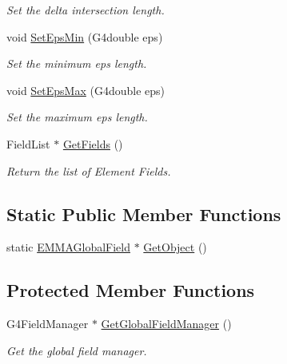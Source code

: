 \begin{DoxyCompactItemize}
\begin{DoxyCompactList}\small\item\em Set the delta intersection length. \end{DoxyCompactList}\item 
\hypertarget{classEMMAGlobalField_a9fe3615c5d73f4822e7d1a943bc8438c}{void \hyperlink{classEMMAGlobalField_a9fe3615c5d73f4822e7d1a943bc8438c}{Set\-Eps\-Min} (G4double eps)}\label{classEMMAGlobalField_a9fe3615c5d73f4822e7d1a943bc8438c}

\begin{DoxyCompactList}\small\item\em Set the minimum eps length. \end{DoxyCompactList}\item 
\hypertarget{classEMMAGlobalField_ad31573ebe91b18d3de81365ff5c02b0b}{void \hyperlink{classEMMAGlobalField_ad31573ebe91b18d3de81365ff5c02b0b}{Set\-Eps\-Max} (G4double eps)}\label{classEMMAGlobalField_ad31573ebe91b18d3de81365ff5c02b0b}

\begin{DoxyCompactList}\small\item\em Set the maximum eps length. \end{DoxyCompactList}\item 
\hypertarget{classEMMAGlobalField_a44035b4b2d642ec3faa2719bc6ed6b06}{Field\-List $\ast$ \hyperlink{classEMMAGlobalField_a44035b4b2d642ec3faa2719bc6ed6b06}{Get\-Fields} ()}\label{classEMMAGlobalField_a44035b4b2d642ec3faa2719bc6ed6b06}

\begin{DoxyCompactList}\small\item\em Return the list of Element Fields. \end{DoxyCompactList}\end{DoxyCompactItemize}
\subsection*{Static Public Member Functions}
\begin{DoxyCompactItemize}
\item 
static \hyperlink{classEMMAGlobalField}{E\-M\-M\-A\-Global\-Field} $\ast$ \hyperlink{classEMMAGlobalField_a7824c5b6a605797979abe3e9c20bac3c}{Get\-Object} ()
\end{DoxyCompactItemize}
\subsection*{Protected Member Functions}
\begin{DoxyCompactItemize}
\item 
\hypertarget{classEMMAGlobalField_a5a447e35fe4336d12b0635298e9dce51}{G4\-Field\-Manager $\ast$ \hyperlink{classEMMAGlobalField_a5a447e35fe4336d12b0635298e9dce51}{Get\-Global\-Field\-Manager} ()}\label{classEMMAGlobalField_a5a447e35fe4336d12b0635298e9dce51}

\begin{DoxyCompactList}\small\item\em Get the global field manager. \end{DoxyCompactList}\end{DoxyCompactItemize}


